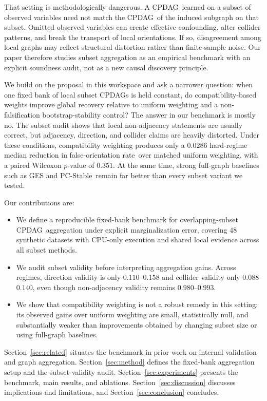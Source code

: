 \documentclass{article}
\newcommand{\pcstable}{PC-Stable}
\newcommand{\cpdag}{CPDAG}
\newcommand{\forate}{false-orientation rate}
\begin{document}
That setting is methodologically dangerous. A \cpdag\ learned on a subset of observed variables need not match the \cpdag\ of the induced subgraph on that subset. Omitted observed variables can create effective confounding, alter collider patterns, and break the transport of local orientations. If so, disagreement among local graphs may reflect structural distortion rather than finite-sample noise. Our paper therefore studies subset aggregation as an empirical benchmark with an explicit soundness audit, not as a new causal discovery principle.

We build on the proposal in this workspace and ask a narrower question: when one fixed bank of local subset \cpdag s is held constant, do compatibility-based weights improve global recovery relative to uniform weighting and a non-falsification bootstrap-stability control? The answer in our benchmark is mostly no. The subset audit shows that local non-adjacency statements are usually correct, but adjacency, direction, and collider claims are heavily distorted. Under these conditions, compatibility weighting produces only a $0.0286$ hard-regime median reduction in \forate\ over matched uniform weighting, with a paired Wilcoxon $p$-value of $0.351$. At the same time, strong full-graph baselines such as GES and \pcstable\ remain far better than every subset variant we tested.

Our contributions are:
\begin{itemize}[leftmargin=*,topsep=2pt,itemsep=1pt]
  \item We define a reproducible fixed-bank benchmark for overlapping-subset \cpdag\ aggregation under explicit marginalization error, covering $48$ synthetic datasets with CPU-only execution and shared local evidence across all subset methods.
  \item We audit subset validity before interpreting aggregation gains. Across regimes, direction validity is only $0.110$--$0.158$ and collider validity only $0.088$--$0.140$, even though non-adjacency validity remains $0.980$--$0.993$.
  \item We show that compatibility weighting is not a robust remedy in this setting: its observed gains over uniform weighting are small, statistically null, and substantially weaker than improvements obtained by changing subset size or using full-graph baselines.
\end{itemize}

Section~\ref{sec:related} situates the benchmark in prior work on internal validation and graph aggregation. Section~\ref{sec:method} defines the fixed-bank aggregation setup and the subset-validity audit. Section~\ref{sec:experiments} presents the benchmark, main results, and ablations. Section~\ref{sec:discussion} discusses implications and limitations, and Section~\ref{sec:conclusion} concludes.
\end{document}
